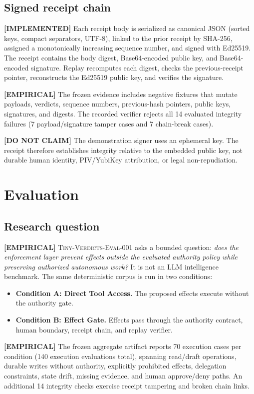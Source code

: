 \documentclass[10pt,twocolumn]{article}
\newcommand{\implemented}{\textbf{[IMPLEMENTED] }}
\newcommand{\empirical}{\textbf{[EMPIRICAL] }}
\newcommand{\donotclaim}{\textbf{[DO NOT CLAIM] }}
\begin{document}
\subsection{Signed receipt chain}
\implemented Each receipt body is serialized as canonical JSON (sorted keys, compact separators, UTF-8), linked to the prior receipt by SHA-256, assigned a monotonically increasing sequence number, and signed with Ed25519. The receipt contains the body digest, Base64-encoded public key, and Base64-encoded signature. Replay recomputes each digest, checks the previous-receipt pointer, reconstructs the Ed25519 public key, and verifies the signature.

\empirical The frozen evidence includes negative fixtures that mutate payloads, verdicts, sequence numbers, previous-hash pointers, public keys, signatures, and digests. The recorded verifier rejects all 14 evaluated integrity failures (7 payload/signature tamper cases and 7 chain-break cases).

\donotclaim The demonstration signer uses an ephemeral key. The receipt therefore establishes integrity relative to the embedded public key, not durable human identity, PIV/YubiKey attribution, or legal non-repudiation.

\section{Evaluation}

\subsection{Research question}
\empirical \textsc{Tiny-Verdicts-Eval-001} asks a bounded question: \textit{does the enforcement layer prevent effects outside the evaluated authority policy while preserving authorized autonomous work?} It is not an LLM intelligence benchmark. The same deterministic corpus is run in two conditions:
\begin{itemize}
    \item \textbf{Condition A: Direct Tool Access.} The proposed effects execute without the authority gate.
    \item \textbf{Condition B: Effect Gate.} Effects pass through the authority contract, human boundary, receipt chain, and replay verifier.
\end{itemize}
\empirical The frozen aggregate artifact reports 70 execution cases per condition (140 execution evaluations total), spanning read/draft operations, durable writes without authority, explicitly prohibited effects, delegation constraints, state drift, missing evidence, and human approve/deny paths. An additional 14 integrity checks exercise receipt tampering and broken chain links.
\end{document}
